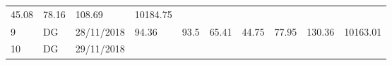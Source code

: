\documentclass[
  11pt,
]{article}
\begin{document}
\begin{longtable}[]{@{}llllllllll@{}}
\begin{minipage}[t]{0.06\columnwidth}
45.08\strut
\end{minipage} & \begin{minipage}[t]{0.06\columnwidth}\raggedright
78.16\strut
\end{minipage} & \begin{minipage}[t]{0.13\columnwidth}\raggedright
108.69\strut
\end{minipage} & \begin{minipage}[t]{0.08\columnwidth}\raggedright
10184.75\strut
\end{minipage}\tabularnewline
\begin{minipage}[t]{0.04\columnwidth}\raggedright
9\strut
\end{minipage} & \begin{minipage}[t]{0.09\columnwidth}\raggedright
DG\strut
\end{minipage} & \begin{minipage}[t]{0.10\columnwidth}\raggedright
28/11/2018\strut
\end{minipage} & \begin{minipage}[t]{0.06\columnwidth}\raggedright
94.36\strut
\end{minipage} & \begin{minipage}[t]{0.06\columnwidth}\raggedright
93.5\strut
\end{minipage} & \begin{minipage}[t]{0.06\columnwidth}\raggedright
65.41\strut
\end{minipage} & \begin{minipage}[t]{0.06\columnwidth}\raggedright
44.75\strut
\end{minipage} & \begin{minipage}[t]{0.06\columnwidth}\raggedright
77.95\strut
\end{minipage} & \begin{minipage}[t]{0.13\columnwidth}\raggedright
130.36\strut
\end{minipage} & \begin{minipage}[t]{0.08\columnwidth}\raggedright
10163.01\strut
\end{minipage}\tabularnewline
\begin{minipage}[t]{0.04\columnwidth}\raggedright
10\strut
\end{minipage} & \begin{minipage}[t]{0.09\columnwidth}\raggedright
DG\strut
\end{minipage} & \begin{minipage}[t]{0.10\columnwidth}\raggedright
29/11/2018\strut
\end{minipage} & \begin{minipage}[t]{0.06\columnwidth}\raggedright

\end{minipage}
\end{longtable}
\end{document}
